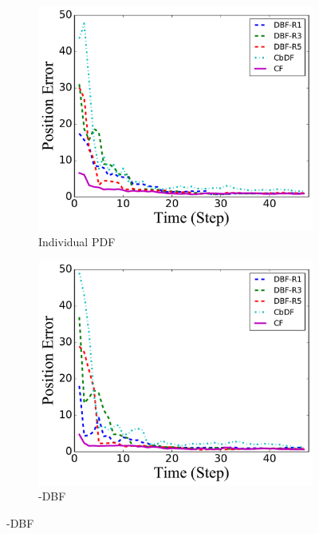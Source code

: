 	\begin{figure}%
		\centering
		\begin{subfigure}[b]{0.23\textwidth}
			\includegraphics[width=\textwidth]{figures/hetero_mov_sen_mov_tar_pos_err_noise_linear}
			\caption{Individual PDF}\label{fig:lin_pos_err}
		\end{subfigure}
		\begin{subfigure}[b]{0.23\textwidth}
			\includegraphics[width=\textwidth]{figures/hetero_mov_sen_mov_tar_pos_err_noise_circle}
			\caption{\proto-DBF}\label{fig:cir_pos_err}
		\end{subfigure}

\end{figure}
